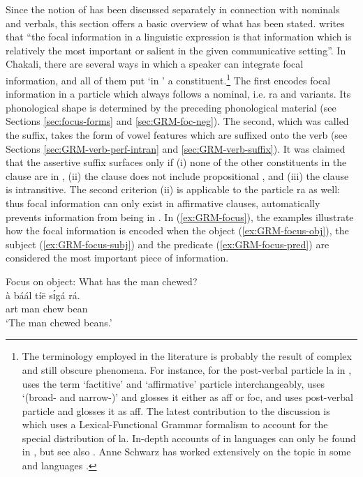 \begin{exe}
\begin{exe}
\begin{exe}
\begin{exe}
\begin{exe}
\begin{exe}
\begin{exe}
\begin{exe}
\begin{exe}
\begin{exe}
\begin{exe}
\begin{exe}
Since the notion of  has been discussed separately in connection with nominals and verbals, this section offers a basic overview of what has been stated.  \citet[326]{Dik97} writes that   ``the focal information in a linguistic expression is that information which is relatively the most important or salient in the given communicative setting''.  In Chakali, there are  several ways in which a speaker can integrate focal information, and all of them put `in ' a constituent.\footnote{The  terminology employed in the literature is probably the result of  complex and still obscure phenomena. For instance, for the post-verbal particle {\sls la} in , \citet{Bodo97} uses the term `factitive' and  `affirmative' particle interchangeably, \citet{Daku05} uses `(broad- and narrow-)' and glosses it either as {\sc aff} or {\sc foc}, and \citet{Saan03} uses post-verbal particle and glosses it as {\sc aff}. The latest contribution  to the  discussion is  \citet{hiro14} which uses a Lexical-Functional Grammar formalism to account for the  special distribution of  {\sls la}. In-depth accounts of  in  languages can only be found in \citet{blas90}, but see also \citet{mcgi99}. Anne Schwarz has worked extensively on the topic in some  and  languages \citep{Schw10}.}   The first encodes focal information in a particle which  always follows a nominal, i.e. {\sls ra} and variants. Its  phonological shape is determined by the preceding phonological material (see Sections \ref{sec:focus-forms} and \ref{sec:GRM-foc-neg}). The second, which was called the  suffix, takes the form of vowel features which are suffixed onto the verb  (see Sections \ref{sec:GRM-verb-perf-intran} and \ref{sec:GRM-verb-suffix}). It was claimed that  the assertive suffix surfaces only if (i) none of the other constituents in the clause are in , (ii) the clause does not include propositional , and (iii) the clause is intransitive. The second criterion (ii) is applicable to the particle {\sls ra} as well: thus focal information can only exist in  affirmative clauses,  automatically prevents information from being in .  In (\ref{ex:GRM-focus}),  the examples illustrate  how the  focal information is encoded when the object (\ref{ex:GRM-focus-obj}), the subject (\ref{ex:GRM-focus-subj}) and the predicate  (\ref{ex:GRM-focus-pred}) are considered the most important piece of information. 

\newpage 
\ea\label{ex:GRM-focus} 
 \ea\label{ex:GRM-focus-obj}{\rm Focus on object: What has the man chewed?}\\
\gll   à báál tíē sɪ́gá rá.\\
   {\sc art} man chew bean {\foc}\\
\glt `The man chewed {\sc beans}.'


\end{exe}
\end{exe}
\end{exe}
\end{exe}
\end{exe}
\end{exe}
\end{exe}
\end{exe}
\end{exe}
\end{exe}
\end{exe}
\end{exe}
